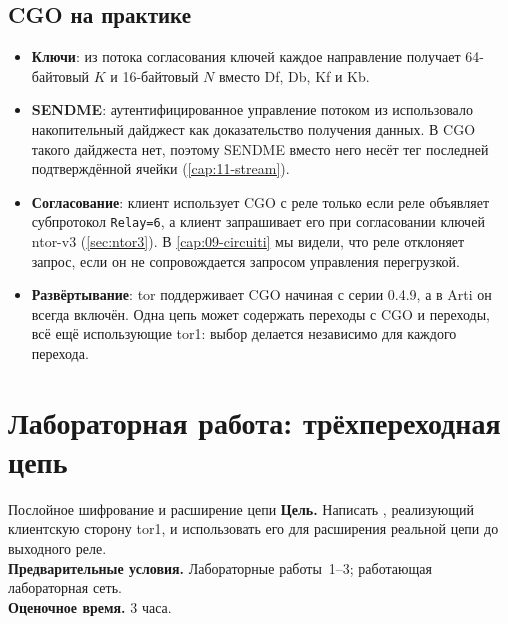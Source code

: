 \subsection{CGO на практике}

\begin{itemize}
  \item \textbf{Ключи}: из потока согласования ключей каждое направление получает 64-байтовый $K$ и 16-байтовый $N$ вместо Df, Db, Kf и Kb.
  \item \textbf{SENDME}: аутентифицированное управление потоком из  использовало накопительный дайджест как доказательство получения данных. В CGO такого дайджеста нет, поэтому SENDME вместо него несёт тег последней подтверждённой ячейки (\cref{cap:11-stream}).
  \item \textbf{Согласование}: клиент использует CGO с реле только если реле объявляет субпротокол \texttt{Relay=6}, а клиент запрашивает его при согласовании ключей ntor-v3 (\cref{sec:ntor3}). В \cref{cap:09-circuiti} мы видели, что реле отклоняет запрос, если он не сопровождается запросом управления перегрузкой.
  \item \textbf{Развёртывание}: tor поддерживает CGO начиная с серии 0.4.9, а в Arti он всегда включён. Одна цепь может содержать переходы с CGO и переходы, всё ещё использующие tor1: выбор делается независимо для каждого перехода.
\end{itemize}

\section{Лабораторная работа: трёхпереходная цепь}\label{sec:lab-cifratura}

\begin{laboratorio}[4]{Послойное шифрование и расширение цепи}
\textbf{Цель.} Написать , реализующий клиентскую сторону tor1, и использовать его для расширения реальной цепи до выходного реле.\\
\textbf{Предварительные условия.} Лабораторные работы~1--3; работающая лабораторная сеть.\\
\textbf{Оценочное время.} 3 часа.
\end{laboratorio}

